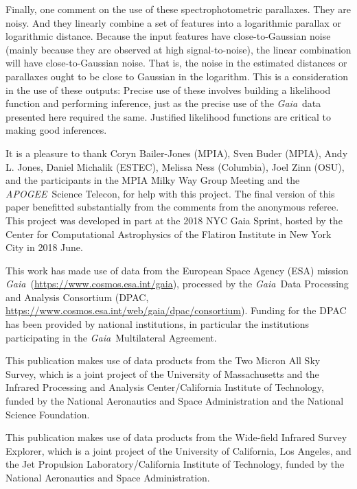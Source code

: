 \documentclass[modern]{aastex62}
\newcommand{\acronym}[1]{{\small{#1}}}
\newcommand{\project}[1]{\textsl{#1}}
\newcommand{\apogee}{\project{\acronym{APOGEE}}}
\newcommand{\gaia}{\project{Gaia}}
\begin{document}
Finally, one comment on the use of these spectrophotometric parallaxes.
They are noisy.
And they linearly combine a set of features into a logarithmic parallax or
logarithmic distance.
Because the input features have close-to-Gaussian noise (mainly
because they are observed at high signal-to-noise), the linear
combination will have close-to-Gaussian noise.
That is, the noise in the estimated distances or parallaxes ought to be close
to Gaussian in the logarithm.
This is a consideration in the use of these outputs:
Precise use of these involves building a likelihood function and performing inference,
just as the precise use of the \gaia\ data presented here required the same.
Justified likelihood functions are critical to making good inferences.

\acknowledgements
It is a pleasure to thank
  Coryn Bailer-Jones (\acronym{MPIA}),
  Sven Buder (\acronym{MPIA}),
  Andy L. Jones,
  Daniel Michalik (\acronym{ESTEC}),
  Melissa Ness (Columbia),
  Joel Zinn (OSU),
  and the participants in the \acronym{MPIA} Milky Way Group Meeting
  and the \apogee\ Science Telecon,
for help with this project.
The final version of this paper benefitted substantially from the comments
  from the anonymous referee.
This project was developed in part at the
2018 \acronym{NYC} Gaia Sprint, hosted by the Center for Computational Astrophysics of
the Flatiron Institute in New York City in 2018 June.

This work has made use of data from the European Space Agency (\acronym{ESA}) mission
\gaia\ (\url{https://www.cosmos.esa.int/gaia}), processed by the \gaia\ Data
Processing and Analysis Consortium (\acronym{DPAC},
\url{https://www.cosmos.esa.int/web/gaia/dpac/consortium}). Funding for the
\acronym{DPAC}
has been provided by national institutions, in particular the institutions
participating in the \gaia\ Multilateral Agreement.

This publication makes use of data products from the Two Micron All Sky Survey, which is a joint project of the University of Massachusetts and the Infrared Processing and Analysis Center/California Institute of Technology, funded by the National Aeronautics and Space Administration and the National Science Foundation.

This publication makes use of data products from the Wide-field Infrared Survey Explorer, which is a joint project of the University of California, Los Angeles, and the Jet Propulsion Laboratory/California Institute of Technology, funded by the National Aeronautics and Space Administration.
\end{document}
